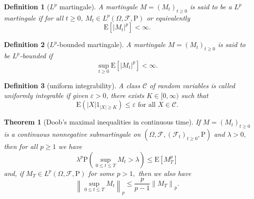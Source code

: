 \documentclass{report}
\newtheorem{definition}{Definition}[section]
\newtheorem{theorem}{Theorem}[section]
\theoremstyle{nonumberplain}
\begin{document}
\begin{definition}[$L^p$ martingale]
	A martingale $M=(M_t)_{t\ge0}$ is said to be a $L^p$ \emph{martingale} if for all $t\ge0$, $M_t\in L^p(\Omega,\mathcal{F},\mathrm{P})$ or equivalently
	$$
	\mathrm{E}\left[|M_{t}|^{p}\right]<\infty.
	$$
\end{definition}

\begin{definition}[$L^p$-bounded martingale]
	A martingale $M=(M_t)_{t\ge0}$ is said to be $L^p$-\emph{bounded} if 
	$$
	\sup _{t \geq 0} \mathrm{E}\left[|M_{t}|^{p}\right]<\infty.
	$$
\end{definition}


\begin{definition}[uniform integrability]
	A class $\mathcal {C}$ of random variables is called \emph{uniformly integrable} if given $\varepsilon >0$, there exists $K\in [0,\infty )$ such that 
	\[
	\mathrm{E}\left(|X| 1_{|X| \geq K}\right) \leq \varepsilon \text { for all } X \in \mathcal{C}.
	\]	
\end{definition}

\begin{theorem}[Doob's maximal inequalities in continuous time]
If $M=(M_{t})_{t\ge0}$ is a continuous nonnegative submartingale on $(\Omega,\mathcal{F},(\mathcal{F}_{t})_{t\ge0},\mathrm{P})$ and $\lambda>0,$ then for all $p \geq 1$ we have
\[
\lambda^{p} \mathrm{P}\left(\sup_{0 \le t \le T} M_{t}>\lambda\right) \le \mathrm{E}\left[M_{T}^{p}\right]
\]
and, if $M_{T} \in L^{p}(\Omega,\mathcal{F},\mathrm{P})$ for some $p>1,$ then we also have
\[
\left\|\sup_{0 \leq t \leq T} M_{t}\right\|_{p} \leq \frac{p}{p-1}\left\|M_{T}\right\|_{p}.
\]
\end{theorem}
\end{document}

